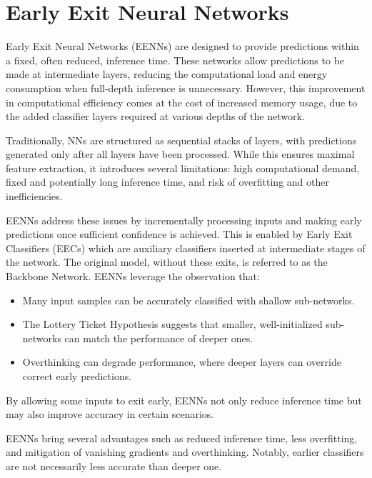 \section{Early Exit Neural Networks}

Early Exit Neural Networks (EENNs) are designed to provide predictions within a fixed, often reduced, inference time. 
These networks allow predictions to be made at intermediate layers, reducing the computational load and energy consumption when full-depth inference is unnecessary. 
However, this improvement in computational efficiency comes at the cost of increased memory usage, due to the added classifier layers required at various depths of the network.

Traditionally, NNs are structured as sequential stacks of layers, with predictions generated only after all layers have been processed. 
While this ensures maximal feature extraction, it introduces several limitations: high computational demand, fixed and potentially long inference time, and risk of overfitting and other inefficiencies.

EENNs address these issues by incrementally processing inputs and making early predictions once sufficient confidence is achieved. 
This is enabled by Early Exit Classifiers (EECs) which are auxiliary classifiers inserted at intermediate stages of the network. 
The original model, without these exits, is referred to as the Backbone Network.
EENNs leverage the observation that:
\begin{itemize}
    \item Many input samples can be accurately classified with shallow sub-networks.
    \item The Lottery Ticket Hypothesis suggests that smaller, well-initialized sub-networks can match the performance of deeper ones.
    \item Overthinking can degrade performance, where deeper layers can override correct early predictions.
\end{itemize}
\noindent By allowing some inputs to exit early, EENNs not only reduce inference time but may also improve accuracy in certain scenarios.

EENNs bring several advantages such as reduced inference time, less overfitting, and mitigation of vanishing gradients and overthinking. 
Notably, earlier classifiers are not necessarily less accurate than deeper one.

